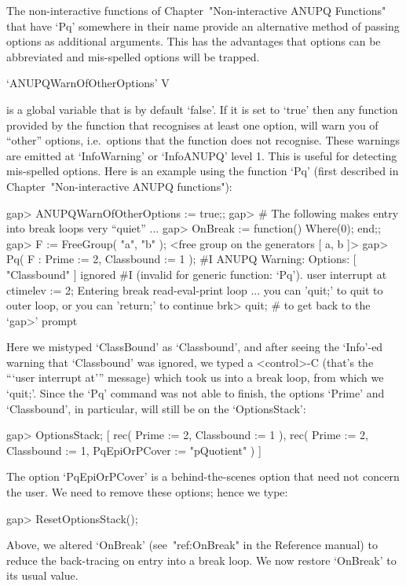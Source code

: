 The   non-interactive   functions   of   Chapter~"Non-interactive   ANUPQ
Functions" that have `Pq' somewhere in their name provide an  alternative
method  of  passing  options  as  additional  arguments.  This  has   the
advantages that options can be abbreviated and mis-spelled  options  will
be trapped.

\>`ANUPQWarnOfOtherOptions' V

is a global variable that is by default `false'. If it is set  to  `true'
then any function provided by the {\ANUPQ} function  that  recognises  at
least one option, will warn you of ``other'' options,  i.e.~options  that
the  function  does  not  recognise.  These  warnings  are   emitted   at
`InfoWarning' or `InfoANUPQ'  level  1.  This  is  useful  for  detecting
mis-spelled options. Here is an example using the  function  `Pq'  (first
described in Chapter~"Non-interactive ANUPQ functions"):

\begintt
gap> ANUPQWarnOfOtherOptions := true;;
gap> # The following makes entry into break loops very ``quiet'' ...
gap> OnBreak := function() Where(0); end;;
gap> F := FreeGroup( "a", "b" );
<free group on the generators [ a, b ]>
gap> Pq( F : Prime := 2, Classbound := 1 );
#I  ANUPQ Warning: Options: [ "Classbound" ] ignored
#I  (invalid for generic function: `Pq').
user interrupt at
ctimelev := 2;
Entering break read-eval-print loop ...
you can 'quit;' to quit to outer loop, or
you can 'return;' to continue
brk> quit; # to get back to the `gap>' prompt
\endtt

Here we mistyped `ClassBound'  as  `Classbound',  and  after  seeing  the
`Info'-ed warning that `Classbound' was ignored, we typed  a  <control>-C
(that's the ```user interrupt at''' message) which took us into  a  break
loop, from which we `quit;'. Since the  `Pq'  command  was  not  able  to
finish, the options `Prime' and `Classbound', in particular,  will  still
be on the `OptionsStack':

\begintt
gap> OptionsStack;
[ rec( Prime := 2, Classbound := 1 ), 
  rec( Prime := 2, Classbound := 1, PqEpiOrPCover := "pQuotient" ) ]
\endtt

The option `PqEpiOrPCover' is a behind-the-scenes option  that  need  not
concern the user. We need to remove these options; hence we type:

\beginexample
gap> ResetOptionsStack();
\endexample

Above, we altered `OnBreak' (see~"ref:OnBreak" in the  Reference  manual)
to reduce the back-tracing on entry into a break  loop.  We  now  restore
`OnBreak' to its usual value.

